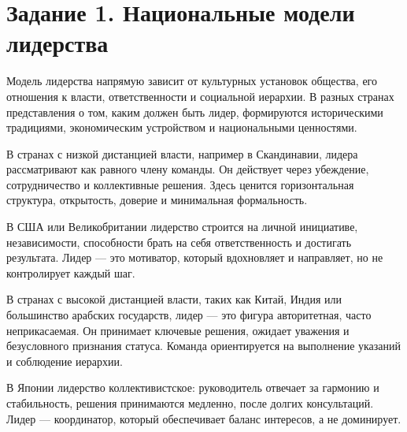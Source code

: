 \documentclass[14pt,a4paper]{extarticle}
\begin{document}
\section{Задание 1. Национальные модели лидерства}
\begin{sloppypar}
Модель лидерства напрямую зависит от культурных установок общества, его
    отношения к власти, ответственности и социальной иерархии. В разных странах
    представления о том, каким должен быть лидер, формируются историческими
    традициями, экономическим устройством и национальными ценностями.

    В странах с низкой дистанцией власти, например в Скандинавии, лидера
    рассматривают как равного члену команды. Он действует через убеждение,
    сотрудничество и коллективные решения. Здесь ценится горизонтальная
    структура, открытость, доверие и минимальная формальность.

    В США или Великобритании лидерство строится на личной инициативе,
    независимости, способности брать на себя ответственность и достигать
    результата. Лидер — это мотиватор, который вдохновляет и направляет, но не
    контролирует каждый шаг.

    В странах с высокой дистанцией власти, таких как Китай, Индия или
    большинство арабских государств, лидер — это фигура авторитетная, часто
    неприкасаемая. Он принимает ключевые решения, ожидает уважения и
    безусловного признания статуса. Команда ориентируется на выполнение
    указаний и соблюдение иерархии.

    В Японии лидерство коллективистское: руководитель отвечает за гармонию и
    стабильность, решения принимаются медленно, после долгих консультаций.
    Лидер — координатор, который обеспечивает баланс интересов, а не
    доминирует.
\end{sloppypar}
\end{document}
